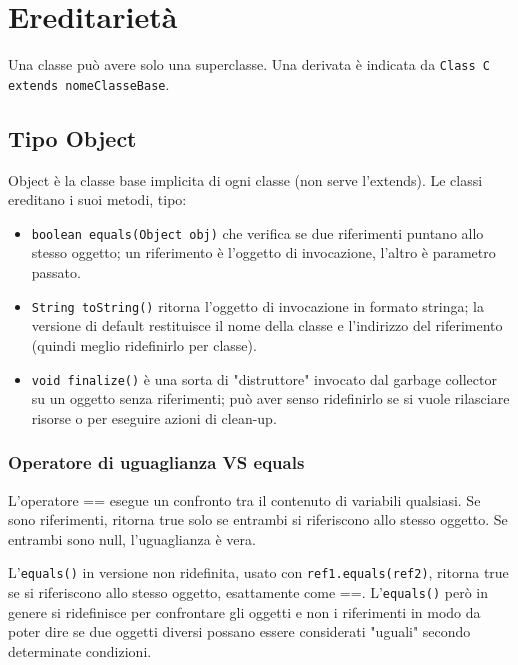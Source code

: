 
\chapter{Ereditarietà}

Una classe può avere solo una superclasse. Una derivata è indicata da \texttt{Class C extends nomeClasseBase{}}. 

\section{Tipo Object} %
Object è la classe base implicita di ogni classe (non serve l'extends). Le classi ereditano i suoi metodi, tipo:
\begin{itemize}
\item \texttt{boolean equals(Object obj)} che verifica se due riferimenti puntano allo stesso oggetto; un riferimento è l'oggetto di invocazione, l'altro è parametro passato. 
\item \texttt{String toString()} ritorna l'oggetto di invocazione in formato stringa; la versione di default restituisce il nome della classe e l'indirizzo del riferimento (quindi meglio ridefinirlo per classe).
\item \texttt{void finalize()} è una sorta di "distruttore" invocato dal garbage collector su un oggetto senza riferimenti; può aver senso ridefinirlo se si vuole rilasciare risorse o per eseguire azioni di clean-up.
\end{itemize}

\subsection{Operatore di uguaglianza VS equals} %
L'operatore == esegue un confronto tra il contenuto di variabili qualsiasi. Se sono riferimenti, ritorna true solo se entrambi si riferiscono allo stesso oggetto. Se entrambi sono null, l'uguaglianza è vera.

L'\texttt{equals()} in versione non ridefinita, usato con \texttt{ref1.equals(ref2)}, ritorna true se si riferiscono allo stesso oggetto, esattamente come ==. L'\texttt{equals()} però in genere si ridefinisce per confrontare gli oggetti e non i riferimenti in modo da poter dire se due oggetti diversi possano essere considerati "uguali" secondo determinate condizioni.

